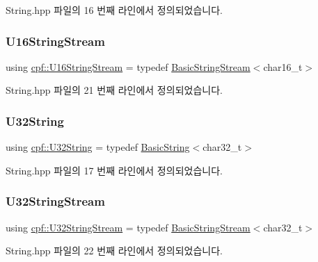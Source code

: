 String.\+hpp 파일의 16 번째 라인에서 정의되었습니다.

\mbox{\label{namespacecpf_a401e80bf9227c14c3f1f27121ba489d1}} 
\subsubsection{\texorpdfstring{U16\+String\+Stream}{U16StringStream}}
{\footnotesize\ttfamily using \hyperlink{namespacecpf_a401e80bf9227c14c3f1f27121ba489d1}{cpf\+::\+U16\+String\+Stream} = typedef \hyperlink{namespacecpf_a1fe334b3d2422535a1cfe51785d98cb8}{Basic\+String\+Stream}$<$char16\+\_\+t$>$}



String.\+hpp 파일의 21 번째 라인에서 정의되었습니다.

\mbox{\label{namespacecpf_a71279c3a3d59ed723c48245204f8c0e5}} 
\subsubsection{\texorpdfstring{U32\+String}{U32String}}
{\footnotesize\ttfamily using \hyperlink{namespacecpf_a71279c3a3d59ed723c48245204f8c0e5}{cpf\+::\+U32\+String} = typedef \hyperlink{namespacecpf_ac91c8c57a370a5bef21ac23f876ad536}{Basic\+String}$<$char32\+\_\+t$>$}



String.\+hpp 파일의 17 번째 라인에서 정의되었습니다.

\mbox{\label{namespacecpf_a7e95b195d831b69d8e661dd685128097}} 
\subsubsection{\texorpdfstring{U32\+String\+Stream}{U32StringStream}}
{\footnotesize\ttfamily using \hyperlink{namespacecpf_a7e95b195d831b69d8e661dd685128097}{cpf\+::\+U32\+String\+Stream} = typedef \hyperlink{namespacecpf_a1fe334b3d2422535a1cfe51785d98cb8}{Basic\+String\+Stream}$<$char32\+\_\+t$>$}



String.\+hpp 파일의 22 번째 라인에서 정의되었습니다.

